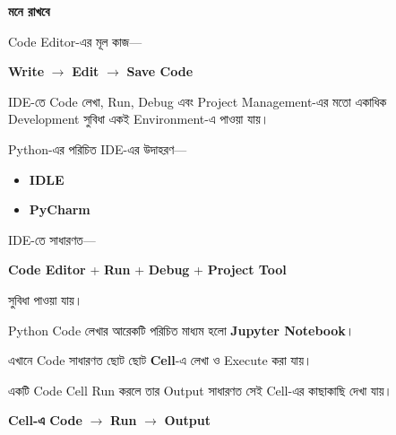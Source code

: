 \begin{rememberbox}

\textbf{\color{deepOrange}মনে রাখবে}

Code Editor-এর মূল কাজ—

\begin{center}

\textbf{Write}
\(\longrightarrow\)
\textbf{Edit}
\(\longrightarrow\)
\textbf{Save Code}

\end{center}

\end{rememberbox}



IDE-তে Code লেখা, Run, Debug এবং Project Management-এর মতো
একাধিক Development সুবিধা একই Environment-এ পাওয়া যায়।

Python-এর পরিচিত IDE-এর উদাহরণ—

\begin{itemize}

\item \textbf{IDLE}

\item \textbf{PyCharm}

\end{itemize}

IDE-তে সাধারণত—

\begin{center}

\textbf{Code Editor}
+
\textbf{Run}
+
\textbf{Debug}
+
\textbf{Project Tool}

\end{center}

সুবিধা পাওয়া যায়।



Python Code লেখার আরেকটি পরিচিত মাধ্যম হলো
\textbf{Jupyter Notebook}।

এখানে Code সাধারণত ছোট ছোট
\textbf{Cell}-এ লেখা ও Execute করা যায়।

একটি Code Cell Run করলে তার Output সাধারণত সেই Cell-এর
কাছাকাছি দেখা যায়।

\begin{center}

\textbf{Cell-এ Code}
\(\longrightarrow\)
\textbf{Run}
\(\longrightarrow\)
\textbf{Output}

\end{center}

